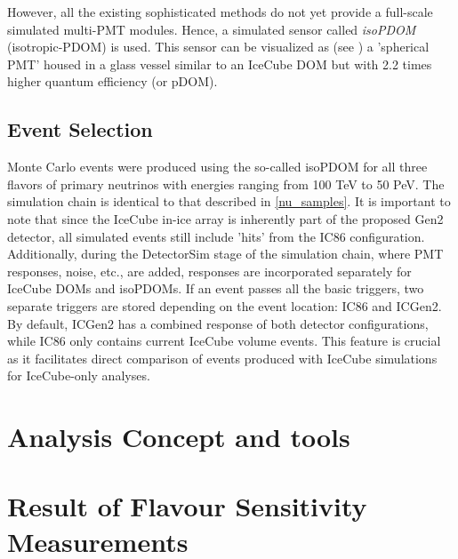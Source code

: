 
However, all the existing sophisticated methods do not yet provide a full-scale simulated multi-PMT modules. Hence, a simulated sensor called \emph{isoPDOM} (isotropic-PDOM) is used. This sensor can be visualized as (see ) a 'spherical PMT' housed in a glass vessel similar to an IceCube DOM but with 2.2 times higher quantum efficiency (or pDOM). 



\subsection{Event Selection}
\label{sec:gen2_eventsample}
Monte Carlo events were produced using the so-called isoPDOM for all three flavors of primary neutrinos with energies ranging from 100 TeV to 50 PeV. The simulation chain is identical to that described in \ref{nu_samples}. It is important to note that since the IceCube in-ice array is inherently part of the proposed Gen2 detector, all simulated events still include 'hits' from the IC86 configuration. Additionally, during the DetectorSim stage of the simulation chain, where PMT responses, noise, etc., are added, responses are incorporated separately for IceCube DOMs and isoPDOMs. If an event passes all the basic triggers, two separate triggers are stored depending on the event location: IC86 and ICGen2. By default, ICGen2 has a combined response of both detector configurations, while IC86 only contains current IceCube volume events. This feature is crucial as it facilitates direct comparison of events produced with IceCube simulations for IceCube-only analyses.


\section{Analysis Concept and tools}
\label{sec:gen2-software}




\section{Result of Flavour Sensitivity Measurements}
\label{sec:gen2-results}
